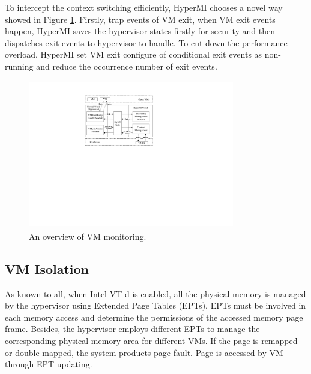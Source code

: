 \documentclass[conference]{IEEEtran}
\begin{document}
%
To intercept the context switching efficiently, HyperMI chooses a novel way showed in Figure \ref{fig4}. Firstly, trap events of VM exit, when VM exit events happen, HyperMI saves the hypervisor states firstly for security and then dispatches exit events to hypervisor to handle. To cut down the performance overload, HyperMI set VM exit configure of conditional exit events as non-running and reduce the occurrence number of exit events.
\begin{figure}
\centerline{\includegraphics[width=9cm,height=6.5cm]{pdfvmcs4.pdf}}%
\caption{An overview of VM monitoring.} \label{fig4}
\end{figure}
\subsection{VM Isolation}\label{VMISolation}
As known to all, when Intel VT-d is enabled, all the physical memory is managed by the hypervisor using Extended Page Tables (EPTs), EPTs must be involved in each memory access and determine the permissions of the accessed memory page frame. Besides, the hypervisor employs different EPTs to manage the corresponding physical memory area for different VMs. If the page is remapped or double mapped, the system products page fault. Page is accessed by VM through EPT updating.
\end{document}
